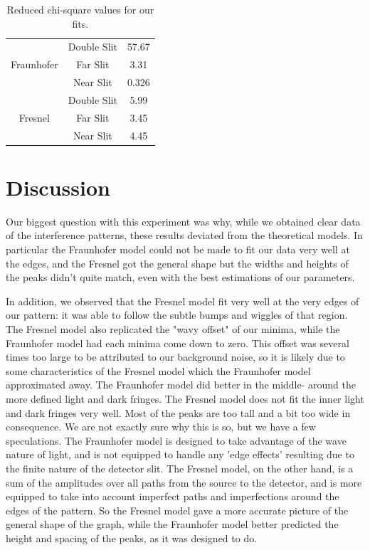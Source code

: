 \documentclass[prb,preprint]{revtex4-1}
\begin{document}
\begin{table}[h!]
\centering
\caption{Reduced chi-square values for our fits. }
\begin{ruledtabular}
\begin{tabular}{ccc}
 \multirow{3}{*}{Fraunhofer} & Double Slit &57.67                                            \\
                            & Far Slit    & 3.31                                           \\
                            & Near Slit   & 0.326                                 \\
\hline
\multirow{3}{*}{Fresnel}    & Double Slit &          5.99                                    \\
                            & Far Slit    & 3.45                                           \\
                            & Near Slit   & 4.45                                      
\end{tabular}
\end{ruledtabular}
\label{chi-square}
\end{table}


\section{Discussion}

Our biggest question with this experiment was why, while we obtained clear data of the interference patterns, these results deviated from the theoretical models.  In particular the Fraunhofer model could not be made to fit our data very well at the edges, and the Fresnel got the general shape but the widths and heights of the peaks didn't quite match, even with the best estimations of our parameters. 

In addition, we observed that the Fresnel model fit very well at the very edges of our pattern:  it was able to follow the subtle bumps and wiggles of that region.  The Fresnel model also replicated the "wavy offset" of our minima, while the Fraunhofer model had each minima come down to zero.  This offset was several times too large to be attributed to our background noise, so it is likely due to some characteristics of the Fresnel model which the Fraunhofer model approximated away.  The Fraunhofer model did better in the middle- around the more defined light and dark fringes.  The Fresnel model does not fit the inner light and dark fringes very well.  Most of the peaks are too tall and a bit too wide in consequence. We are not exactly sure why this is so, but we have a few speculations.    The Fraunhofer model is designed to take advantage of the wave nature of light, and is not equipped to handle any 'edge effects' resulting due to the finite nature of the detector slit.  The Fresnel model, on the other hand, is a sum of the amplitudes over all paths from the source to the detector, and is more equipped to take into account imperfect paths and imperfections around the edges of the pattern.  So the Fresnel model gave a more accurate picture of the general shape of the graph, while the Fraunhofer model better predicted the height and spacing of the peaks, as it was designed to do.  \cite{teachspin}
\end{document}
